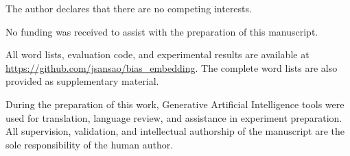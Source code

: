 \documentclass{sbc2019}
\begin{document}
\begin{interests}
The author declares that there are no competing interests.
\end{interests}

\begin{funding}
No funding was received to assist with the preparation of this manuscript.
\end{funding}

\begin{materials}
All word lists, evaluation code, and experimental results are available at \url{https://github.com/jsansao/bias\_embedding}. The complete word lists are also provided as supplementary material.
\end{materials}

\begin{acknowledgements}
During the preparation of this work, Generative Artificial Intelligence tools were used for translation, language review, and assistance in experiment preparation. All supervision, validation, and intellectual authorship of the manuscript are the sole responsibility of the human author.
\end{acknowledgements}



\end{document}
